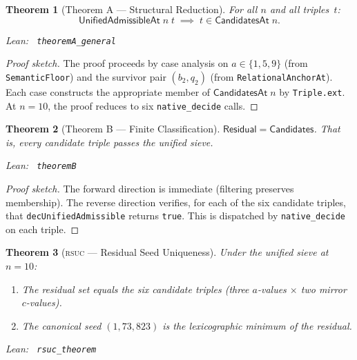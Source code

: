 \documentclass[11pt,a4paper]{article}
\newenvironment{leanref}%
  {\par\smallskip\noindent\begingroup\raggedright\textup{Lean:}~}%
  {\par\endgroup}
\newtheorem{theorem}{Theorem}[section]
\theoremstyle{definition}
\newcommand{\rsuc}{\textsc{rsuc}}
\begin{document}
\begin{theorem}[Theorem A --- Structural Reduction]\label{thm:A}
For all $n$ and all triples~$t$:
\[
\mathsf{UnifiedAdmissibleAt}\;n\;t \;\implies\; t \in
\mathsf{CandidatesAt}\;n.
\]

\begin{leanref} \lstinline|theoremA_general|
\end{leanref}
\end{theorem}

\begin{proof}[Proof sketch]
The proof proceeds by case analysis on $a \in \{1, 5, 9\}$ (from
\texttt{SemanticFloor}) and the survivor pair $(b_2, q_2)$ (from
\texttt{RelationalAnchorAt}).  Each case constructs the appropriate
member of $\mathsf{CandidatesAt}\;n$ by \texttt{Triple.ext}.  At
$n = 10$, the proof reduces to six \texttt{native\_decide} calls.
\end{proof}

\begin{theorem}[Theorem B --- Finite Classification]\label{thm:B}
$\mathsf{Residual} = \mathsf{Candidates}$.  That is, every candidate
triple passes the unified sieve.

\begin{leanref} \lstinline|theoremB|
\end{leanref}
\end{theorem}

\begin{proof}[Proof sketch]
The forward direction is immediate (filtering preserves membership).
The reverse direction verifies, for each of the six candidate triples,
that \texttt{decUnifiedAdmissible} returns \texttt{true}.  This is
dispatched by \texttt{native\_decide} on each triple.
\end{proof}

\begin{theorem}[\rsuc{} --- Residual Seed Uniqueness]\label{thm:rsuc}
Under the unified sieve at $n = 10$:
\begin{enumerate}[nosep]
\item The residual set equals the six candidate triples (three
  $a$-values $\times$ two mirror $c$-values).
\item The canonical seed $(1, 73, 823)$ is the lexicographic minimum
  of the residual.
\end{enumerate}

\begin{leanref} \lstinline|rsuc_theorem|
\end{leanref}
\end{theorem}
\end{document}
